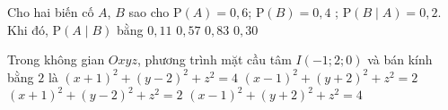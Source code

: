 \begin{ex}%
Cho hai biến cố $A$, $B$ sao cho $\mathrm{P}(A) = 0{,}6$; $\mathrm{P}(B) = 0{,}4$ ; $\mathrm{P}(B\mid A) = 0{,}2$. Khi đó, $\mathrm{P}(A\mid B)$ bằng
\choice
{$0{,}11$}
{$0{,}57$}
{$0{,}83$}
{\True $0{,}30$}
\end{ex}

\begin{ex}%
Trong không gian $Oxyz$, phương trình mặt cầu tâm $I(-1;2;0)$ và bán kính bằng $2$ là
\choice
{$(x+1)^{2}+(y-2)^{2}+z^{2}=4$}
{$(x-1)^{2}+(y+2)^{2}+z^{2}=2$}
{$(x+1)^{2}+(y-2)^{2}+z^{2}=2$}
{\True $(x-1)^{2}+(y+2)^{2}+z^{2}=4$}
\end{ex}

